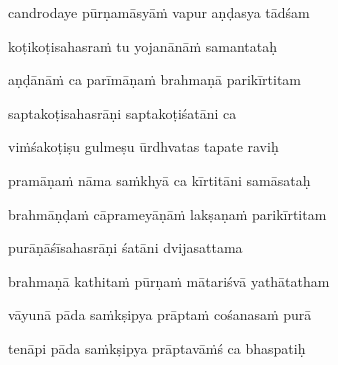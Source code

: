candrodaye pūrṇamāsyā\.m vapur aṇḍasya tādśam \veg\dontdisplaylinenum

koṭikoṭisahasra\.m tu yojanānā\.m samantataḥ\thinspace{\dandab} \dontdisplaylinenum

aṇḍānā\.m ca parīmāṇa\.m brahmaṇā parikīrtitam \veg\dontdisplaylinenum

saptakoṭisahasrāṇi saptakoṭiśatāni ca\thinspace{\dandab} \dontdisplaylinenum

vi\.mśakoṭiṣu gulmeṣu ūrdhvatas tapate raviḥ \veg\dontdisplaylinenum

pramāṇa\.m nāma sa\.mkhyā ca kīrtitāni samāsataḥ\thinspace{\dandab} \dontdisplaylinenum

brahmāṇḍa\.m cāprameyāṇā\.m lakṣaṇa\.m parikīrtitam \veg\dontdisplaylinenum


purāṇāśīsahasrāṇi śatāni dvijasattama\thinspace{\dandab} \dontdisplaylinenum

brahmaṇā kathita\.m pūrṇa\.m mātariśvā yathātatham \veg\dontdisplaylinenum

vāyunā pāda sa\.mkṣipya prāpta\.m cośanasa\.m purā\thinspace{\dandab} \dontdisplaylinenum

tenāpi pāda sa\.mkṣipya prāptavā\.mś ca bhaspatiḥ \veg\dontdisplaylinenum

